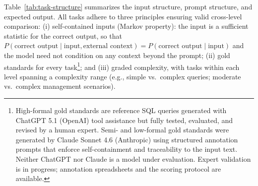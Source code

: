 \documentclass[runningheads]{llncs}
\begin{document}
\noindent Table~\ref{tab:task-structure} summarizes the input structure, prompt structure, and expected output.
All tasks adhere to three principles ensuring valid cross-level comparison: (i) self-contained inputs (Markov property): the input is a sufficient statistic for the correct output, so that $P(\text{correct output} \mid \text{input}, \text{external context}) = P(\text{correct output} \mid \text{input})$ and the model need not condition on any context beyond the prompt;
(ii) gold standards for every task\footnote{High-formal gold standards are reference SQL queries generated with ChatGPT 5.1 (OpenAI) tool assistance but fully tested, evaluated, and revised by a human expert. Semi- and low-formal gold standards were generated by Claude Sonnet 4.6 (Anthropic) using structured annotation prompts that enforce self-containment and traceability to the input text. Neither ChatGPT nor Claude is a model under evaluation. Expert validation is in progress; annotation spreadsheets and the scoring protocol are available.}; and (iii) graded complexity, with tasks within each level spanning a complexity range (e.g., simple vs.\ complex queries; moderate vs.\ complex management scenarios).
\end{document}
